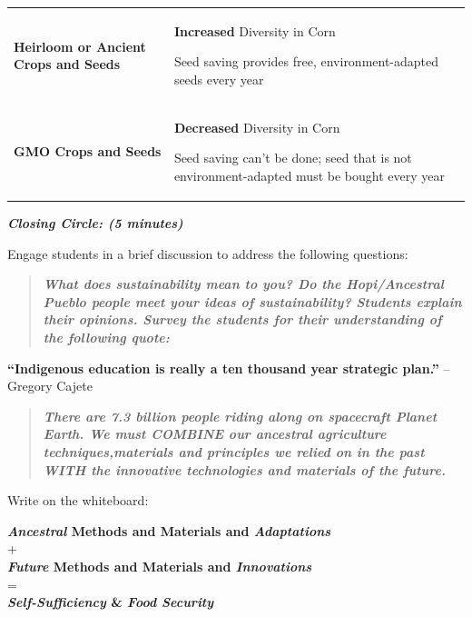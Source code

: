 \documentclass[12pt,]{article}
\begin{document}
\begin{longtable}[]{@{}ll@{}}
\toprule
\endhead
\begin{minipage}[t]{0.47\columnwidth}\raggedright
\textbf{Heirloom or Ancient Crops and
Seeds}\strut
\end{minipage} & \begin{minipage}[t]{0.47\columnwidth}\raggedright
\textbf{Increased} Diversity in Corn

Seed saving provides free,
environment-adapted seeds every
year\strut
\end{minipage}\tabularnewline
\begin{minipage}[t]{0.47\columnwidth}\raggedright
\textbf{GMO Crops and Seeds}\strut
\end{minipage} & \begin{minipage}[t]{0.47\columnwidth}\raggedright
\textbf{Decreased} Diversity in Corn

Seed saving can't be done; seed
that is not environment-adapted
must be bought every year\strut
\end{minipage}\tabularnewline
\bottomrule
\end{longtable}

\textbf{\emph{Closing Circle: (5 minutes)}}

Engage students in a brief discussion to address the following
questions:

\begin{quote}
\textbf{\emph{What does sustainability mean to you? Do the Hopi/Ancestral Pueblo
people meet your ideas of sustainability? Students explain their
opinions. Survey the students for their understanding of the following
quote:}}
\end{quote}

\textbf{``Indigenous education is really a ten thousand year strategic plan.''}
-- Gregory Cajete

\begin{quote}
\textbf{\emph{There are 7.3 billion people riding along on spacecraft Planet Earth.
We must COMBINE our ancestral agriculture techniques,materials and
principles we relied on in the past WITH the innovative technologies and
materials of the future.}}
\end{quote}

Write on the whiteboard:

\textbf{\emph{Ancestral} Methods and Materials and \emph{Adaptations}}\\
+\\
\textbf{\emph{Future} Methods and Materials and \emph{Innovations}}\\
=\\
\textbf{\emph{Self-Sufficiency} \& \emph{Food Security}}
\end{document}

